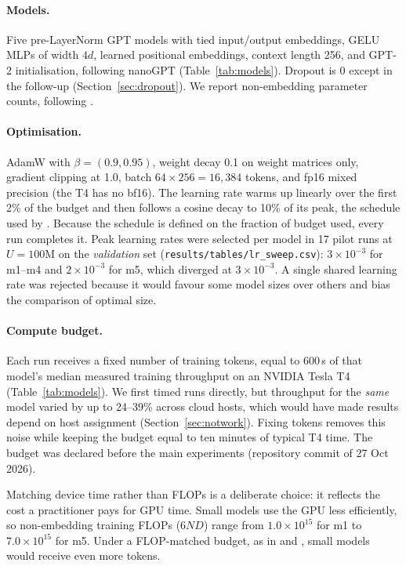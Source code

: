 \documentclass[11pt]{article}
\begin{document}
\paragraph{Models.}
Five pre-LayerNorm GPT models \citep{vaswani2017attention,radford2019gpt2} with tied input/output
embeddings, GELU MLPs of width $4d$, learned positional embeddings, context length 256, and GPT-2
initialisation, following nanoGPT \citep{karpathy2022nanogpt} (Table~\ref{tab:models}). Dropout is 0 except in
the follow-up (Section~\ref{sec:dropout}). We report non-embedding parameter counts, following
\citet{kaplan2020scaling}.

\paragraph{Optimisation.}
AdamW \citep{loshchilov2019adamw} with $\beta=(0.9,0.95)$, weight decay 0.1 on weight matrices only,
gradient clipping at 1.0, batch $64\times256=16{,}384$ tokens, and fp16 mixed precision (the T4 has no
bf16). The learning rate warms up linearly over the first 2\% of the budget and then follows a cosine
decay to 10\% of its peak, the schedule used by \citet{muennighoff2023scaling}. Because the schedule is
defined on the fraction of budget used, every run completes it. Peak learning rates were selected per
model in 17 pilot runs at $U=100$M on the \emph{validation} set (\texttt{results/tables/lr\_sweep.csv}): $3\times10^{-3}$
for m1--m4 and $2\times10^{-3}$ for m5, which diverged at $3\times10^{-3}$. A single shared learning rate
was rejected because it would favour some model sizes over others and bias the comparison of optimal size.

\paragraph{Compute budget.}\label{sec:budget}
Each run receives a fixed number of training tokens, equal to 600\,s of that model's median measured
training throughput on an NVIDIA Tesla T4 (Table~\ref{tab:models}). We first timed runs directly, but
throughput for the \emph{same} model varied by up to 24--39\% across cloud hosts, which would have made
results depend on host assignment (Section~\ref{sec:notwork}). Fixing tokens removes this noise while
keeping the budget equal to ten minutes of typical T4 time. The budget was declared before the main
experiments (repository commit of 27 Oct 2026).

Matching device time rather than FLOPs is a deliberate choice: it reflects the cost a practitioner pays
for GPU time. Small models use the GPU less efficiently, so non-embedding training FLOPs ($6ND$) range from
$1.0\times10^{15}$ for m1 to $7.0\times10^{15}$ for m5. Under a FLOP-matched budget, as in
\citet{hoffmann2022chinchilla} and \citet{muennighoff2023scaling}, small models would receive even more tokens.
\end{document}
